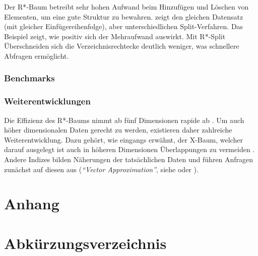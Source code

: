 \documentclass[runningheads,a4paper]{llncs}
\begin{document}
{	Der R*-Baum betreibt sehr hohen Aufwand beim Hinzufügen und Löschen von Elementen, um eine gute Struktur zu bewahren.  zeigt den gleichen Datensatz (mit gleicher Einfügereihenfolge), aber unterschiedlichen Split-Verfahren. Das Beispiel zeigt, wie positiv sich der Mehraufwand auswirkt. Mit R*-Split Überschneiden sich die Verzeichnisrechtecke deutlich weniger, was schnellere Abfragen ermöglicht.

	\subsubsection{Benchmarks} %
	\label{ssub:benchmarks}
	

	\subsubsection{Weiterentwicklungen} %
	\label{ssub:weiterentwicklungen}

	Die Effizienz des R*-Baums nimmt ab fünf Dimensionen rapide ab \citep[vgl][29]{Kriegel:2008}. Um auch höher dimensionalen Daten gerecht zu werden, existieren daher zahlreiche Weiterentwicklung. Dazu gehört, wie eingangs erwähnt, der X-Baum, welcher darauf ausgelegt ist auch in höheren Dimensionen Überlappungen zu vermeiden \citep[vgl.]{Kriegel:1996}.
	Andere Indizes bilden Näherungen der tatsächlichen Daten und führen Anfragen zunächst auf diesen aus (\emph{\enquote{Vector Approximation}}, siehe \cite{Gibas:2008} oder \cite{Daoudi:2008}).
	




\newpage
\begin{appendix}

	\section*{Anhang}

	\section*{Abkürzungsverzeichnis} %
	\label{sub:abbreviations}

		\begin{acronym}[length]
	  \end{acronym}


\end{appendix}}
\end{document}
